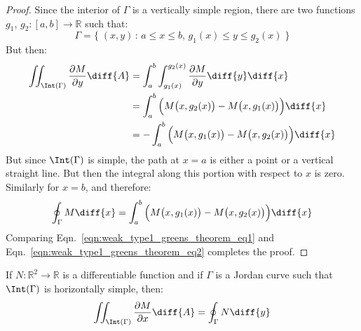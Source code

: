     \begin{proof}
        Since the interior of $\Gamma$ is a vertically simple region,
        there are two functions
        $g_{1}$, $g_{2}:[a,b]\rightarrow\mathbb{R}$ such that:
        \begin{equation}
            \Gamma=\{\;(x,y)\,:\,a\leq{x}\leq{b},\,
                                 g_{1}(x)\leq{y}\leq{g}_{2}(x)\;\}
        \end{equation}
        But then:
        \begin{subequations}
            \label{eqn:weak_type1_greens_theorem_eq1}%
            \begin{align}
                \iint_{\Int(\Gamma)}
                    \frac{\partial{M}}{\partial{y}}\diff{A}
                &=\int_{a}^{b}\int_{g_{1}(x)}^{g_{2}(x)}
                    \frac{\partial{M}}{\partial{y}}
                    \diff{y}\diff{x}\\
                &=\int_{a}^{b}
                    \Big(M\big(x,g_{2}(x)\big)
                    -M\big(x,g_{1}(x)\big)\Big)\diff{x}\\
                &=-\int_{a}^{b}
                    \Big(M\big(x,g_{1}(x)\big)
                    -M\big(x,g_{2}(x)\big)\Big)\diff{x}
            \end{align}
        \end{subequations}
        But since $\Int(\Gamma)$ is simple, the path at $x=a$ is either a
        point or a vertical straight line. But then the integral along
        this portion with respect to $x$ is zero. Similarly for
        $x=b$, and therefore:
        \begin{equation}
            \label{eqn:weak_type1_greens_theorem_eq2}%
            \oint_{\Gamma}M\diff{x}
            =\int_{a}^{b}\Big(M\big(x,g_{1}(x)\big)
                -M\big(x,g_{2}(x)\big)\Big)\diff{x}
        \end{equation}
        Comparing Eqn.~\ref{eqn:weak_type1_greens_theorem_eq1}
        and Eqn.~\ref{eqn:weak_type1_greens_theorem_eq2}
        completes the proof.
    \end{proof}
    \begin{theorem}
        \label{thm:Greens_Theorem_Simple_t2_region}%
        If $N:\mathbb{R}^{2}\rightarrow\mathbb{R}$ is a differentiable
        function and if $\Gamma$ is a Jordan curve such that
        $\Int(\Gamma)$ is horizontally simple, then:
        \begin{equation}
            \iint_{\Int(\Gamma)}\frac{\partial{M}}{\partial{x}}\diff{A}
            =\oint_{\Gamma}N\diff{y}
        \end{equation}
    \end{theorem}
